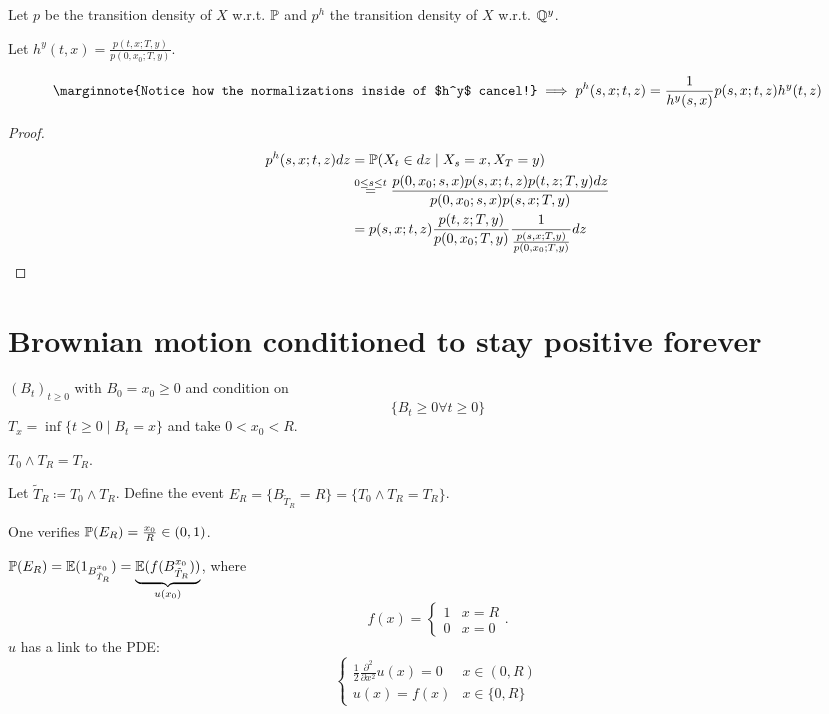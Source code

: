 \begin{lemma}\label{lem:2.7}
    Let $p$ be the transition density of $X$ w.r.t. $\mathbb{P}$ and $p^h$ the transition density of $X$ w.r.t. $\mathbb{Q}^y$.

    Let $h^y(t,x)=\frac{p(t,x;T,y)}{p(0,x_0;T,y)}$.

    \begin{align*}\marginnote{Notice how the normalizations inside of $h^y$ cancel!}
        \implies p^h(s,x;t,z)=\frac{1}{h^y(s,x)}p(s,x;t,z)h^y(t,z)
    \end{align*}
\end{lemma}

\begin{proof}
    \begin{align*}
        p^h(s,x;t,z)dz&=\mathbb{P}(X_t\in dz\mid X_s=x,X_T=y)\\
        &\stackrel{0\leq s\leq t}{=}\frac{p(0,x_0;s,x)p(s,x;t,z)p(t,z;T,y)dz}{p(0,x_0;s,x)p(s,x;T,y)}\\
        &=p(s,x;t,z)\frac{p(t,z;T,y)}{p(0,x_0;T,y)}\frac{1}{\frac{p(s,x;T,y)}{p(0,x_0;T,y)}}dz\qedhere
    \end{align*}
\end{proof}

\section{Brownian motion conditioned to stay positive forever}

 $(B_t)_{t\geq 0}$ with $B_0=x_0\geq 0$ and condition on 
\[\{B_t\geq 0\forall t\geq 0\}\]
$T_x=\inf\{t\geq 0\mid B_t=x\}$ and take $0<x_0<R$.

$T_0\land T_R=T_R$.

Let $\tilde{T}_R\coloneqq T_0\land T_R$. Define the event $E_R=\{B_{\tilde{T}_R}=R\}=\{T_0\land T_R=T_R\}$.

One verifies $\mathbb{P}(E_R)=\frac{x_0}{R}\in (0,1)$.

$\mathbb{P}(E_R)=\mathbb{E}(1_{B_{\tilde{T}_R}^{x_0}})=\underbrace{\mathbb{E}(f(B_{\tilde{T}_R}^{x_0}))}_{u(x_0)}$, where 
\[f(x)=\begin{cases}
    1 & x= R\\
    0 & x=0
\end{cases}.\]
$u$ has a link to the PDE: 
\[\begin{cases}
    \frac{1}{2}\frac{\partial^2}{\partial x^2} u(x)=0&x\in (0,R)\\
    u(x)=f(x) & x\in \{0,R\}
\end{cases}\]

